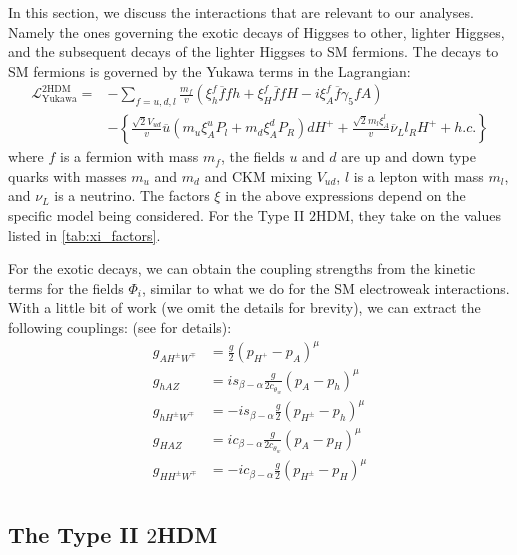 In this section, we discuss the interactions that are relevant to our analyses. Namely the ones governing the exotic decays of Higgses to other, lighter Higgses, and the subsequent decays of the lighter Higgses to SM fermions. The decays to SM fermions is governed by the Yukawa terms in the Lagrangian:
\begin{align}
\mathcal{L}^{\mathrm{2HDM}}_{\text{Yukawa}} =& - \sum_{f = u, d, l} \frac{m_f}{v}
\left(\xi_h^f \overline{f}fh+\xi_H^f \overline{f}fH-i\xi_A^f \overline{f}\gamma_5fA \right)\\
&-\left\{\frac{\sqrt{2}V_{ud}}{v}\overline{u}\left(m_u\xi_A^uP_l+m_d\xi_A^dP_R\right)dH^+ + \frac{\sqrt{2}m_l\xi^l_A}{v}\overline{\nu}_Ll_RH^+ + h.c.\right\}
\label{eq:2HDM_Yukawa_couplings}
\end{align}
where $f$ is a fermion with mass $m_f$, the fields $u$ and $d$ are up and down type quarks with masses $m_u$ and $m_d$ and CKM mixing $V_{ud}$, $l$ is a lepton with mass $m_l$, and $\nu_L$ is a neutrino. 
The factors $\xi$ in the above expressions depend on the specific model being considered. For the Type II $2$HDM, they take on the values listed in \autoref{tab:xi_factors}.

For the exotic decays, we can obtain the coupling strengths from the kinetic terms for the fields $\Phi_i$, similar to what we do for the SM electroweak interactions. With a little bit of work (we omit the details for brevity), we can extract the following couplings: (see \citep{Kling2016a} for details):
\begin{align*}
g_{AH^\pm W^\mp} &= \frac{g}{2}(p_{H^+}-p_{A})^\mu\\
g_{hAZ} &= is_{\beta-\alpha}\frac{g}{2c_{\theta_w}}(p_A-p_h)^\mu\\
g_{hH^\pm W^\mp} &= -is_{\beta-\alpha}\frac{g}{2}(p_{H^\pm}-p_h)^\mu\\
g_{HAZ} &= ic_{\beta-\alpha}\frac{g}{2c_{\theta_w}}(p_A-p_H)^\mu\\
g_{HH^\pm W^\mp} &= -ic_{\beta-\alpha}\frac{g}{2}(p_{H^\pm}-p_H)^\mu\\
\end{align*}

\subsection{The Type II $2$HDM}


